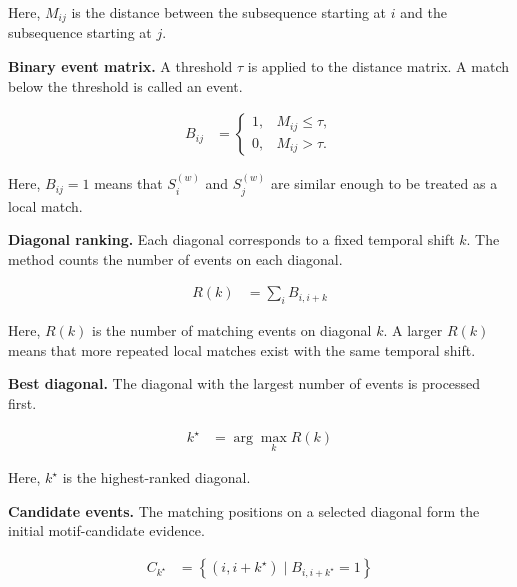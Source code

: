 \documentclass{book}
\begin{document}
      \noindent
      Here, \(M_{ij}\) is the distance between the subsequence starting at \(i\) and the subsequence starting at \(j\).

      \noindent
      \textbf{Binary event matrix.}
      A threshold \(\ensuremath{\tau}\) is applied to the distance matrix. A match below the threshold is called an event.

      \begin{align}
         B_{ij}
         &=
         \begin{cases}
            1, & M_{ij}\leq \ensuremath{\tau},\\
            0, & M_{ij}>\ensuremath{\tau}.
         \end{cases}
      \end{align}

      \noindent
      Here, \(B_{ij}=1\) means that \(S_i^{(w)}\) and \(S_j^{(w)}\) are similar enough to be treated as a local match.

      \noindent
      \textbf{Diagonal ranking.}
      Each diagonal corresponds to a fixed temporal shift \(k\). The method counts the number of events on each diagonal.

      \begin{align}
         R(k)
         &=
         \sum_i B_{i,i+k}
      \end{align}

      \noindent
      Here, \(R(k)\) is the number of matching events on diagonal \(k\). A larger \(R(k)\) means that more repeated local matches exist with the same temporal shift.

      \noindent
      \textbf{Best diagonal.}
      The diagonal with the largest number of events is processed first.

      \begin{align}
         k^\star
         &=
         \arg\max_k R(k)
      \end{align}

      \noindent
      Here, \(k^\star\) is the highest-ranked diagonal.

      \noindent
      \textbf{Candidate events.}
      The matching positions on a selected diagonal form the initial motif-candidate evidence.

      \begin{align}
         C_{k^\star}
         &=
         \left\{
         (i,i+k^\star)
         \mid
         B_{i,i+k^\star}=1
         \right\}
      \end{align}
\end{document}
